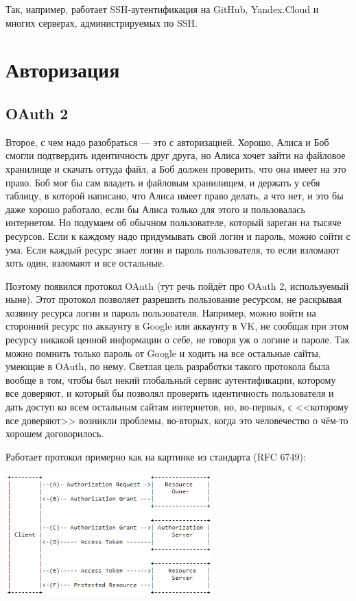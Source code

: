 \documentclass{../mcstext}
\begin{document}
Так, например, работает SSH-аутентификация на GitHub, Yandex.Cloud и многих серверах, администрируемых по SSH.

\section{Авторизация}

\subsection{OAuth 2}

Второе, с чем надо разобраться --- это с авторизацией. Хорошо, Алиса и Боб смогли подтвердить идентичность друг друга, но Алиса хочет зайти на файловое хранилище и скачать оттуда файл, а Боб должен проверить, что она имеет на это право. Боб мог бы сам владеть и файловым хранилищем, и держать у себя таблицу, в которой написано, что Алиса имеет право делать, а что нет, и это бы даже хорошо работало, если бы Алиса только для этого и пользовалась интернетом. Но подумаем об обычном пользователе, который зареган на тысяче ресурсов. Если к каждому надо придумывать свой логин и пароль, можно сойти с ума. Если каждый ресурс знает логин и пароль пользователя, то если взломают хоть один, взломают и все остальные.

Поэтому появился протокол OAuth (тут речь пойдёт про OAuth 2, используемый ныне). Этот протокол позволяет разрешить пользование ресурсом, не раскрывая хозяину ресурса логин и пароль пользователя. Например, можно войти на сторонний ресурс по аккаунту в Google или аккаунту в VK, не сообщая при этом ресурсу никакой ценной информации о себе, не говоря уж о логине и пароле. Так можно помнить только пароль от Google и ходить на все остальные сайты, умеющие в OAuth, по нему. Светлая цель разработки такого протокола была вообще в том, чтобы был некий глобальный сервис аутентификации, которому все доверяют, и который бы позволял проверить идентичность пользователя и дать доступ ко всем остальным сайтам интернетов, но, во-первых, с <<которому все доверяют>> возникли проблемы, во-вторых, когда это человечество о чём-то хорошем договорилось.

Работает протокол примерно как на картинке из стандарта (RFC 6749):

\begin{center}
    \includegraphics[width=0.6\textwidth]{oauth.png}
\end{center}
\end{document}
